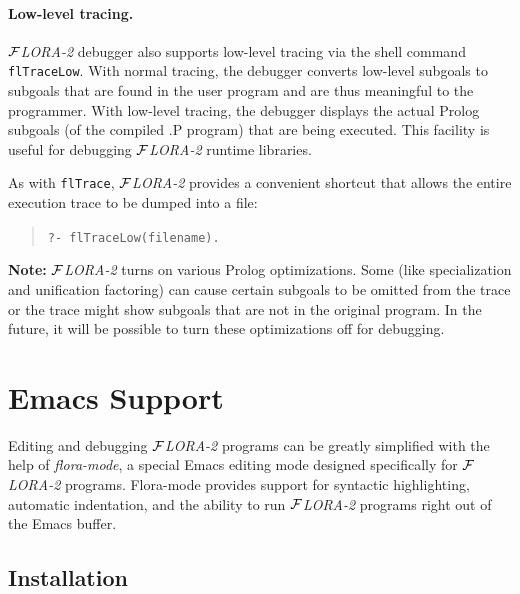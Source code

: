 \documentclass[11pt]{article}
\newcommand{\FLORA}{{\mbox{${\cal F}${\small\it LORA}\rm\emph{-2}}}\xspace}
\begin{document}
\paragraph{Low-level tracing.}
\FLORA debugger also supports low-level tracing via the shell command {\tt
  flTraceLow}. With normal tracing, the debugger converts low-level
subgoals to subgoals that are found in the user program and are thus
meaningful to the programmer. With low-level tracing, the debugger displays
the actual Prolog subgoals (of the compiled .P program) that are being
executed. This facility is useful for debugging \FLORA runtime libraries.

As with {\tt flTrace}, \FLORA provides a convenient shortcut that allows
the entire execution trace to be dumped into a file:
\begin{quote}
 \tt ?- flTraceLow(filename).  
\end{quote}

{\bf Note:} \FLORA turns on various Prolog optimizations. Some (like
specialization and unification factoring) can cause certain subgoals to
be omitted from the trace or the trace might show subgoals that
are not in the original program. In the future, it will be possible to turn
these optimizations off for debugging.


\newpage
\section{Emacs Support}

Editing and debugging \FLORA programs can be greatly simplified with the
help of \emph{flora-mode}, a special Emacs editing mode designed
specifically for \FLORA programs. Flora-mode provides support for syntactic
highlighting, automatic indentation, and the ability to run \FLORA programs
right out of the Emacs buffer.


\subsection{Installation}
\end{document}

